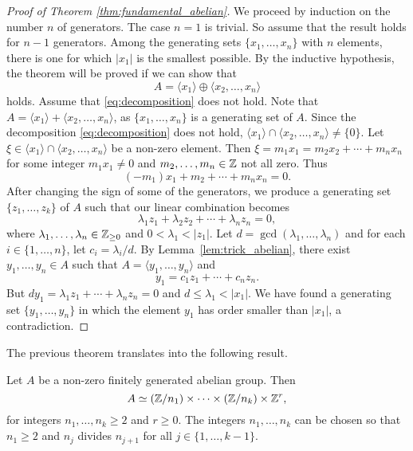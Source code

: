 \begin{proof}[Proof of Theorem \ref{thm:fundamental_abelian}]
    We proceed by induction on the number $n$ of generators. The case $n=1$ is trivial. So assume that the result holds for $n-1$ generators. 
    Among the generating sets $\{x_1,\dots,x_n\}$ 
    with $n$ elements, there is one 
    for which $|x_1|$ is the smallest possible. By the inductive hypothesis, 
    the theorem will be proved if we can show that 
    \begin{equation}
    \label{eq:decomposition}
    A=\langle x_1\rangle\oplus \langle x_2,\dots,x_n\rangle
    \end{equation}
    holds. 
    Assume that \eqref{eq:decomposition} does not hold. 
    Note that 
    $A=\langle x_1\rangle+\langle x_2,\dots,x_n\rangle$, as 
    $\{x_1,\dots,x_n\}$ is a generating set of $A$. Since
    the decomposition  
    \eqref{eq:decomposition} does not hold, 
    $\langle x_1\rangle\cap \langle x_2,\dots,x_n\rangle\ne\{0\}$. Let  
    $\xi\in \langle x_1\rangle\cap \langle x_2,\dots,x_n\rangle$ be a non-zero element. Then 
    $\xi=m_1x_1=m_2x_2+\cdots+m_nx_n$ for some integer 
    $m_1x_1\ne 0$ and $m_2,\dots,m_n\in\mathbb{Z}$ not all zero.  Thus 
    \[ 
    (-m_1)x_1+m_2+\cdots+m_nx_n=0.
    \]
    After changing the sign of some of the generators, 
    we produce a generating set $\{z_1,\dots,z_k\}$ of $A$ 
    such that our linear combination becomes 
    \[ 
    \lambda_1z_1+\lambda_2z_2+\cdots+\lambda_nz_n=0, 
    \]
    where $\lambda_1,\dots,\lambda_n\in\mathbb{Z}_{\geq 0}$ 
    and $0<\lambda_1<|z_1|$. Let $d=\gcd(\lambda_1,\dots,\lambda_n)$ and
    for each $i\in\{1,\dots,n\}$, let 
    $c_i=\lambda_i/d$. 
    By Lemma~\ref{lem:trick_abelian}, there exist 
    $y_1,\dots,y_n\in A$ such that 
    $A=\langle y_1,\dots,y_n\rangle$ and 
    \[ 
    y_1=c_1z_1+\cdots+c_nz_n.
    \]
    But $dy_1=\lambda_1z_1+\cdots+\lambda_nz_n=0$ and 
    $d\leq \lambda_1<|x_1|$. We have found a generating set 
    $\{y_1,\dots,y_n\}$ in which the element
    $y_1$ has order smaller than $|x_1|$, a contradiction. 
\end{proof}

The previous theorem 
translates into the following result.

\begin{theorem}
\label{thm:abelian_factors}
    Let $A$ be a non-zero finitely generated 
    abelian group. Then 
    \[
    A\simeq (\mathbb{Z}/{n_1})\times\cdots\times (\mathbb{Z}/{n_k})\times\mathbb{Z}^r,
    \]
    for integers $n_1,\dots,n_k\geq2$ and 
    $r\geq0$. The integers
    $n_1,\dots,n_k$ 
    can be chosen so that $n_1\geq2$ and 
    $n_j$ divides $n_{j+1}$ for all $j\in\{1,\dots,k-1\}$. 
\end{theorem}


